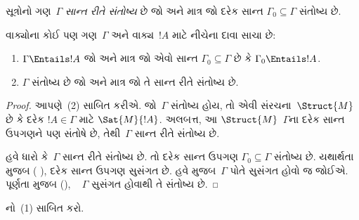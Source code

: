 \begin{defn}
  સૂત્રોનો ગણ~$\Gamma$ \emph{સાન્ત રીતે સંતોષ્ય} છે જો અને માત્ર
  જો દરેક સાન્ત $\Gamma_0\subseteq\Gamma$ સંતોષ્ય છે.
\end{defn}

\begin{thm}[સઘનતા પ્રમેય]
વાક્યોના કોઈ પણ ગણ~$\Gamma$ અને વાક્ય~$!A$ માટે નીચેના દાવા
સાચા છે:
\begin{enumerate}
  \item $\Gamma\Entails !A$ જો અને માત્ર જો એવો સાન્ત
    $\Gamma_0\subseteq\Gamma$ છે કે $\Gamma_0\Entails !A$.
  \item $\Gamma$ સંતોષ્ય છે જો અને માત્ર જો તે સાન્ત રીતે સંતોષ્ય છે.
\end{enumerate}
\end{thm}


\begin{proof}
આપણે~(2) સાબિત કરીએ. જો~$\Gamma$ સંતોષ્ય હોય, તો એવી
સંરચના~$\Struct{M}$
છે કે દરેક $!A\in\Gamma$ માટે
$\Sat{M}{!A}$. અલબત્ત, આ
$\Struct{M}$~$\Gamma$ના દરેક સાન્ત ઉપગણને
પણ સંતોષે છે, તેથી~$\Gamma$ સાન્ત રીતે સંતોષ્ય છે.

હવે ધારો કે~$\Gamma$ સાન્ત રીતે સંતોષ્ય છે. તો દરેક સાન્ત ઉપગણ
$\Gamma_0\subseteq\Gamma$ સંતોષ્ય છે. યથાર્થતા મુજબ
(%
  ),
દરેક સાન્ત ઉપગણ સુસંગત છે. હવે
%
મુજબ~$\Gamma$ પોતે સુસંગત હોવો જ જોઈએ. પૂર્ણતા મુજબ
(), ~ $\Gamma$ સુસંગત હોવાથી તે સંતોષ્ય છે.
\end{proof}

\begin{prob}
નો~(1) સાબિત કરો.
\end{prob}



